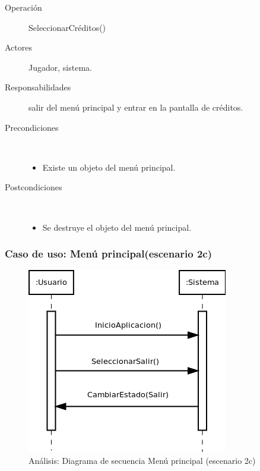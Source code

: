 \begin{description}
    \item [Operación] SeleccionarCréditos()
    \item [Actores] Jugador, sistema.
    \item [Responsabilidades] salir del menú principal y entrar en la pantalla de créditos.
    \item [Precondiciones] $\quad$
        \begin{itemize}
            \item Existe un objeto del menú principal.
        \end{itemize}
    \item [Postcondiciones] $\quad$
        \begin{itemize}
            \item Se destruye el objeto del menú principal.
        \end{itemize}
\end{description}

\subsubsection{Caso de uso: Menú principal(escenario 2c)}

\begin{figure}[H] 
  \label{secuencia_menu_principal4}
  \begin{center}
    \includegraphics[scale=0.7]{imagenes/analisis/secuencia_menu_principal4.png}
  \end{center}
  \caption{Análisis: Diagrama de secuencia Menú principal (escenario 2c)}
\end{figure}

